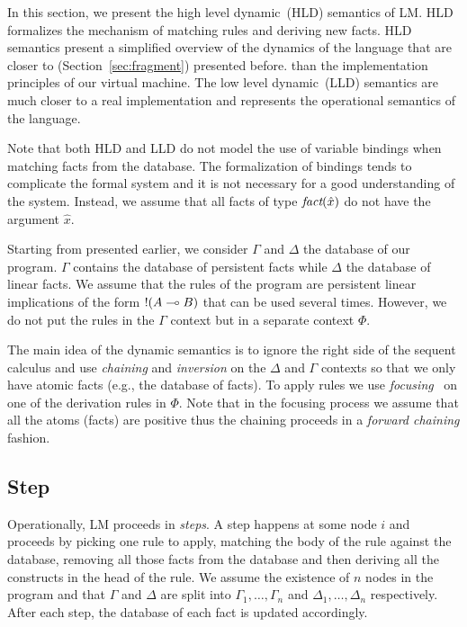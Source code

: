 
In this section, we present the high level dynamic~(HLD) semantics of LM.  HLD
formalizes the mechanism of matching rules and deriving new facts.  HLD
semantics present a simplified overview of the dynamics of the language that are
closer to \fragment (Section~\ref{sec:fragment}) presented before.  than the
implementation principles of our virtual machine. The low level dynamic~(LLD)
semantics are much closer to a real implementation and represents the
operational semantics of the language.

Note that both HLD and LLD do not model the use of variable bindings when
matching facts from the database. The formalization of bindings tends to
complicate the formal system and it is not necessary for a good understanding of
the system. Instead, we assume that all facts of type $\emph{fact}(\hat{x})$ do
not have the argument $\hat{x}$.

Starting from \fragment presented earlier, we consider $\Gamma$ and $\Delta$ the database
of our program. $\Gamma$ contains the database of persistent facts while $\Delta$ the database of linear
facts. We assume that the rules of the program are persistent linear implications of the form
${!} (A \multimap B)$ that can be used several times. However, we do not put the rules in the $\Gamma$
context but in a separate context $\Phi$.

The main idea of the dynamic semantics is to ignore the right side of the
sequent calculus and use \emph{chaining} and \emph{inversion} on the $\Delta$
and $\Gamma$ contexts so that we only have atomic facts (e.g., the database of
facts).  To apply rules we use
\emph{focusing}~\cite{Andreoli92logicprogramming} on one of the derivation rules
in $\Phi$. Note that in the focusing process we assume that all the atoms
(facts) are positive thus the chaining proceeds in a \emph{forward chaining}
fashion.

\subsection{Step}\label{sec:step_hld}

Operationally, LM proceeds in \emph{steps}. A step happens at some node $i$ and
proceeds by picking one rule to apply, matching the body of the rule against the
database, removing all those facts from the database and then deriving all the
constructs in the head of the rule. We assume the existence of $n$ nodes in the
program and that $\Gamma$ and $\Delta$ are split into $\Gamma_1, \dotsc,
\Gamma_n$ and $\Delta_1, \dotsc, \Delta_n$ respectively. After each
step, the database of each fact is updated accordingly.

